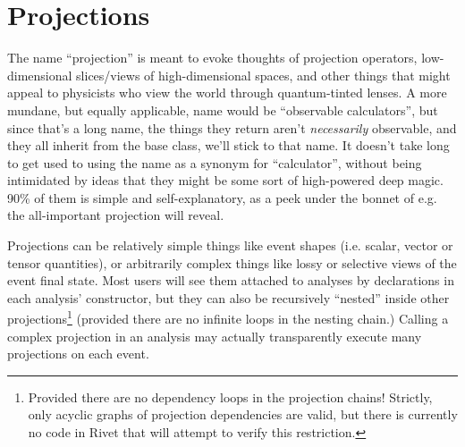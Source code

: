 \documentclass{JHEP3}
\begin{document}


\section{Projections}

The name ``projection'' is meant to evoke thoughts of projection operators,
low-dimensional slices/views of high-dimensional spaces, and other things that
might appeal to physicists who view the world through quantum-tinted lenses. A
more mundane, but equally applicable, name would be ``observable calculators'',
but since that's a long name, the things they return aren't \emph{necessarily}
observable, and they all inherit from the  base class, we'll
stick to that name. It doesn't take long to get used to using the name as a
synonym for ``calculator'', without being intimidated by ideas that they might
be some sort of high-powered deep magic. 90\% of them is simple and
self-explanatory, as a peek under the bonnet of e.g. the all-important
 projection will reveal.

Projections can be relatively simple things like event shapes (i.e. scalar,
vector or tensor quantities), or arbitrarily complex things like lossy or
selective views of the event final state. Most users will see them attached to
analyses by declarations in each analysis' constructor, but they can also be
recursively ``nested'' inside other projections\footnote{Provided there are no
  dependency loops in the projection chains! Strictly, only acyclic graphs of
  projection dependencies are valid, but there is currently no code in Rivet
  that will attempt to verify this restriction.} (provided there are no infinite
loops in the nesting chain.) Calling a complex projection in an analysis may
actually transparently execute many projections on each event.
\end{document}
